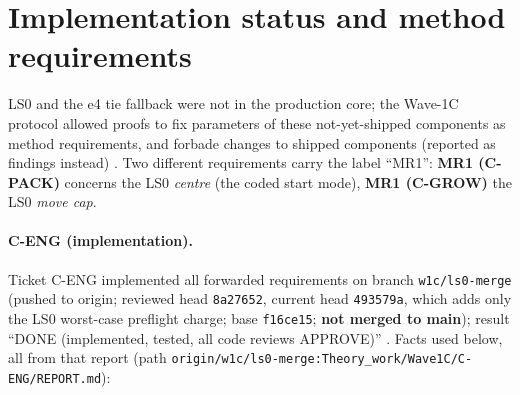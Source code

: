 \section{Implementation status and method requirements}\label{sec:impl}

LS0 and the e4 tie fallback were not in the production core; the Wave-1C protocol allowed proofs to fix parameters of these not-yet-shipped components as method requirements, and forbade changes to shipped components (reported as findings instead) . Two different requirements carry the label ``MR1'': \textbf{MR1 (C-PACK)} concerns the LS0 \emph{centre} (the coded start mode), \textbf{MR1 (C-GROW)} the LS0 \emph{move cap}.

\paragraph{C-ENG (implementation).} Ticket C-ENG implemented all forwarded requirements on branch \texttt{w1c/ls0-merge} (pushed to origin; reviewed head \texttt{8a27652}, current head \texttt{493579a}, which adds only the LS0 worst-case preflight charge; base \texttt{f16ce15}; \textbf{not merged to main}); result ``DONE (implemented, tested, all code reviews APPROVE)'' . Facts used below, all from that report (path \texttt{origin/w1c/ls0-merge:Theory\_work/Wave1C/C-ENG/REPORT.md}):
